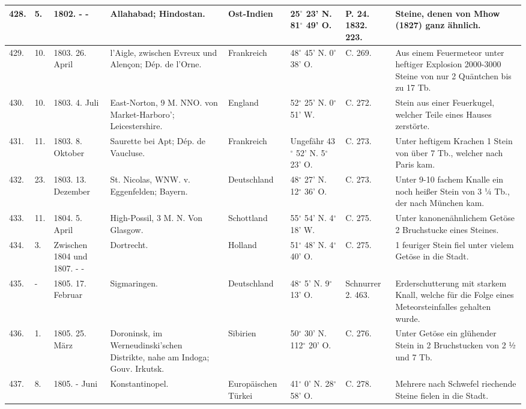 \documentclass[a4paper, 11pt, oneside, polutonikogreek, german]{article}
\begin{document}
\begin{table}[!ht]
\begin{tabular}{|l|l|l|l|l|l|l|l|}
        428. & 5. & 1802. - - & Allahabad; Hindostan. & Ost-Indien & 25$^\circ$ 23' N. 81$^\circ$ 49' O. & P. 24. 1832. 223. & Steine, denen von Mhow (1827) ganz ähnlich. \\ \hline
        429. & 10. & 1803. 26. April & l’Aigle, zwischen Evreux und Alençon; Dép. de l’Orne. & Frankreich & 48$^\circ$ 45' N. 0$^\circ$ 38' O. & C. 269. & Aus einem Feuermeteor unter heftiger Explosion 2000-3000 Steine von nur 2 Quäntchen bis zu 17 Tb. \\ \hline
        430. & 10. & 1803. 4. Juli & East-Norton, 9 M. NNO. von Market-Harboro’; Leicestershire. & England & 52$^\circ$ 25' N. 0$^\circ$ 51' W. & C. 272. & Stein aus einer Feuerkugel, welcher Teile eines Hauses zerstörte. \\ \hline
        431. & 11. & 1803. 8. Oktober & Saurette bei Apt; Dép. de Vaucluse. & Frankreich & Ungefähr 43$^\circ$ 52' N. 5$^\circ$ 23' O. & C. 273. & Unter heftigem Krachen 1 Stein von über 7 Tb., welcher nach Paris kam. \\ \hline
        432. & 23. & 1803. 13. Dezember & St. Nicolas, WNW. v. Eggenfelden; Bayern. & Deutschland & 48$^\circ$ 27' N. 12$^\circ$ 36' O. & C. 273. & Unter 9-10 fachem Knalle ein noch heißer Stein von 3 ¼ Tb., der nach München kam. \\ \hline
        433. & 11. & 1804. 5. April & High-Possil, 3 M. N. Von Glasgow. & Schottland & 55$^\circ$ 54' N. 4$^\circ$ 18' W. & C. 275. & Unter kanonenähnlichem Getöse 2 Bruchstucke eines Steines. \\ \hline
        434. & 3. & Zwischen 1804 und 1807. - - & Dortrecht. & Holland & 51$^\circ$ 48' N. 4$^\circ$ 40' O. & C. 275. & 1 feuriger Stein fiel unter vielem Getöse in die Stadt. \\ \hline
        435. & - & 1805. 17. Februar & Sigmaringen. & Deutschland & 48$^\circ$ 5' N. 9$^\circ$ 13' O. & Schnurrer 2. 463. & Erderschutterung mit starkem Knall, welche für die Folge eines Meteorsteinfalles gehalten wurde. \\ \hline
        436. & 1. & 1805. 25. März & Doroninsk, im Werneudinski’schen Distrikte, nahe am Indoga; Gouv. Irkutsk. & Sibirien & 50$^\circ$ 30' N. 112$^\circ$ 20' O. & C. 276. & Unter Getöse ein glühender Stein in 2 Bruchstucken von 2 ½ und 7 Tb. \\ \hline
        437. & 8. & 1805. - Juni & Konstantinopel. & Europäischen Türkei & 41$^\circ$ 0' N. 28$^\circ$ 58' O. & C. 278. & Mehrere nach Schwefel riechende Steine fielen in die Stadt. \\ \hline

\end{tabular}
\end{table}
\end{document}
